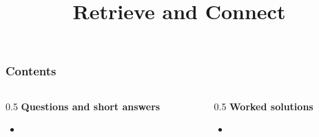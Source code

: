 \documentclass[aspectratio=169]{beamer}
\title{Retrieve and Connect}
\author{}
\date{}
\begin{document}
\frame{\titlepage}

\begin{frame}
  \frametitle{Contents}
  \small
  \begin{columns}[T]
    \begin{column}{0.5\textwidth}
      \textbf{Questions and short answers}
      \begin{itemize}
        \item \hyperlink{q-st1}{}
      \end{itemize}
    \end{column}
    \begin{column}{0.5\textwidth}
      \textbf{Worked solutions}
      \begin{itemize}
        \item \hyperlink{work-st1}{}
      \end{itemize}
    \end{column}
  \end{columns}
\end{frame}
\end{document}
